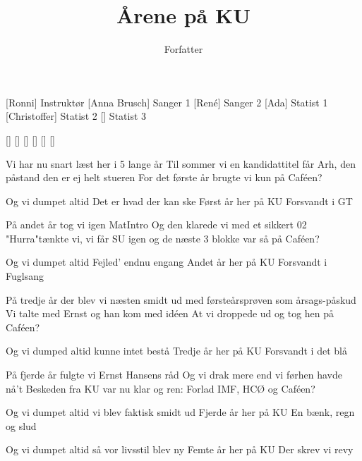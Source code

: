 \documentclass[a4paper,11pt]{article}
\title{Årene på KU}
\author{Forfatter}
\begin{document}
\maketitle

\begin{roles}
[Ronni] Instruktør
[Anna Brusch] Sanger 1
[René] Sanger 2
[Ada] Statist 1
[Christoffer] Statist 2
[] Statist 3
\end{roles}

\begin{props}
[]
[]
[]
[]
[]
[]
\end{props}

\begin{song}
 Vi har nu snart læst her i 5 lange år
Til sommer vi en kandidattitel får
 Arh, den påstand den er ej helt stueren
For det første år brugte vi kun på Caféen?

 Og vi dumpet altid
Det er hvad der kan ske
Først år her på KU
Forsvandt i GT

 På andet år tog vi igen MatIntro
Og den klarede vi med et sikkert 02
 "Hurra"tænkte vi, vi får SU igen
og de næste 3 blokke var så på Caféen?

 Og vi dumpet altid
Fejled' endnu engang
Andet år her på KU
Forsvandt i Fuglsang

 På tredje år der blev vi næsten smidt ud
med førsteårsprøven som årsags-påskud
 Vi talte med Ernst og han kom med idéen
At vi droppede ud og tog hen på Caféen?

 Og vi dumped altid
kunne intet bestå
Tredje år her på KU
Forsvandt i det blå

 På fjerde år fulgte vi Ernst Hansens råd
Og vi drak mere end vi førhen havde nå't
 Beskeden fra KU var nu klar og ren:
Forlad IMF, HCØ og Caféen?

 Og vi dumpet altid
vi blev faktisk smidt ud
Fjerde år her på KU
En bænk, regn og slud

 Og vi dumpet altid
så vor livsstil blev ny
Femte år her på KU
Der skrev vi revy
\end{song}
\end{document}
